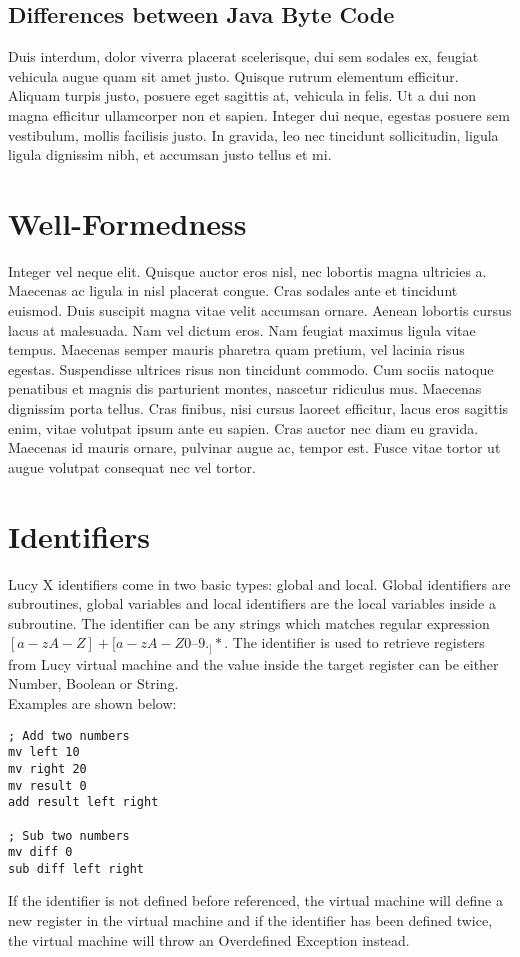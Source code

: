 \subsection{Differences between Java Byte Code}
Duis interdum, dolor viverra placerat scelerisque, dui sem sodales ex, feugiat vehicula augue quam sit amet justo. Quisque rutrum elementum efficitur. Aliquam turpis justo, posuere eget sagittis at, vehicula in felis. Ut a dui non magna efficitur ullamcorper non et sapien. Integer dui neque, egestas posuere sem vestibulum, mollis facilisis justo. In gravida, leo nec tincidunt sollicitudin, ligula ligula dignissim nibh, et accumsan justo tellus et mi.

\section{Well-Formedness}
Integer vel neque elit. Quisque auctor eros nisl, nec lobortis magna ultricies a. Maecenas ac ligula in nisl placerat congue. Cras sodales ante et tincidunt euismod. Duis suscipit magna vitae velit accumsan ornare. Aenean lobortis cursus lacus at malesuada. Nam vel dictum eros. Nam feugiat maximus ligula vitae tempus. Maecenas semper mauris pharetra quam pretium, vel lacinia risus egestas. Suspendisse ultrices risus non tincidunt commodo. Cum sociis natoque penatibus et magnis dis parturient montes, nascetur ridiculus mus. Maecenas dignissim porta tellus. Cras finibus, nisi cursus laoreet efficitur, lacus eros sagittis enim, vitae volutpat ipsum ante eu sapien. Cras auctor nec diam eu gravida. Maecenas id mauris ornare, pulvinar augue ac, tempor est. Fusce vitae tortor ut augue volutpat consequat nec vel tortor.


\section{Identifiers}
Lucy X identifiers come in two basic types: global and local. Global identifiers are subroutines, global variables and local identifiers are the local variables inside a subroutine. The identifier can be any strings which matches regular expression $[a-zA-Z]+[a-zA-Z0–9._]*$. The identifier is used to retrieve registers from Lucy virtual machine and the value inside the target register can be either Number, Boolean or String. \\
Examples are shown below:
\begin{lstlisting}[language=LucyX]
; Add two numbers
mv left 10
mv right 20
mv result 0
add result left right

; Sub two numbers
mv diff 0
sub diff left right
\end{lstlisting}
If the identifier is not defined before referenced, the virtual machine will define a new register in the virtual machine and if the identifier has been defined twice, the virtual machine will throw an Overdefined Exception instead.

